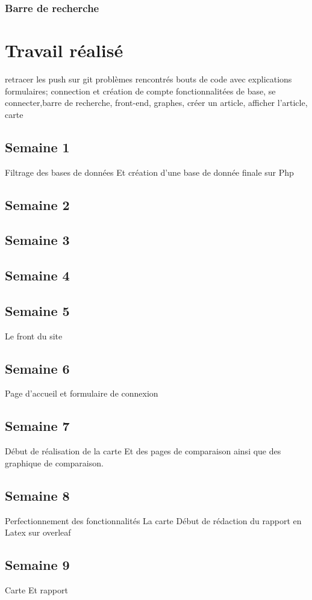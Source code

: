 \documentclass[12pt,a4paper]{report}
\begin{document}
 \subsection{Barre de recherche}


\chapter{Travail réalisé}
retracer les push sur git 
problèmes rencontrés
bouts de code avec explications 
formulaires; connection et création de compte
fonctionnalitées de base, se connecter,barre de recherche, 
front-end, graphes, créer  un article, afficher l'article, carte
\section{Semaine 1}
Filtrage des bases de données
Et création d'une base de donnée finale sur
Php
\section{Semaine 2}
\section{Semaine 3}
\section{Semaine 4}
\section{Semaine 5}
Le front du site
\section{Semaine 6}
Page d'accueil et formulaire de connexion
\section{Semaine 7}
Début de réalisation de la carte
Et des pages de comparaison ainsi que des graphique de comparaison.
\section{Semaine 8}
Perfectionnement des fonctionnalités
La carte
Début de rédaction du rapport en Latex sur
overleaf
\section{Semaine 9}
Carte
Et rapport
\end{document}
